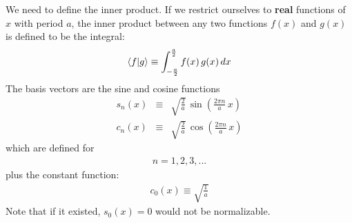 \documentclass[12pt]{book}
\begin{document}
We need to define the inner product. If we restrict ourselves to {\bf real} functions of $x$ with period $a$, the inner product between any two functions $f(x)$ and $g(x)$ is defined to be the integral:
\begin{equation}
\braket{f|g} \equiv \int_{-\frac{a}{2}}^{\frac{a}{2}} f(x) \, g(x) \, dx
\end{equation}
The basis vectors are the sine and cosine functions
\begin{eqnarray}
s_n(x) &\equiv& \sqrt{\frac{2}{a}}\,\sin\left(\frac{2\pi n}{a} \, x \right)\\
c_n(x) &\equiv& \sqrt{\frac{2}{a}}\,\cos\left(\frac{2\pi n}{a} \, x \right)
\end{eqnarray}
which are defined for
\begin{eqnarray*}
n = 1,2,3,...
\end{eqnarray*}
plus the constant function:
\begin{eqnarray}
c_0(x) \equiv \sqrt{\frac{1}{a}}
\end{eqnarray}
Note that if it existed, $s_0(x) = 0$ would not be normalizable.
\end{document}
